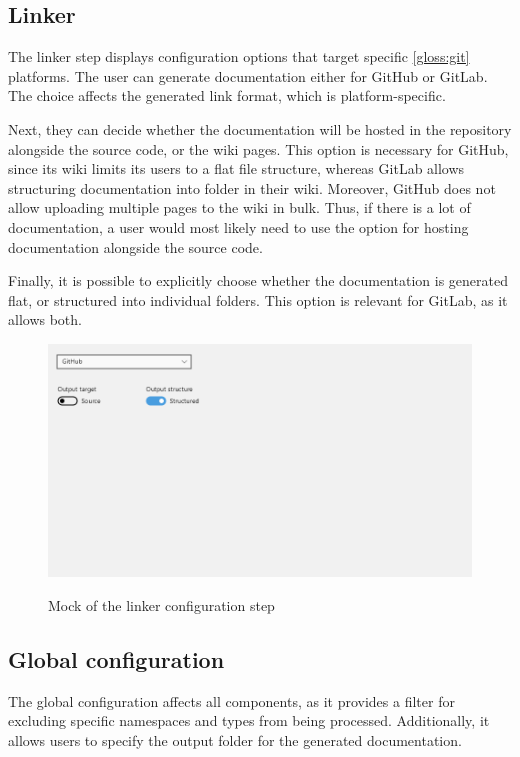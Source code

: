 \pagebreak
\subsection{Linker}

The linker step displays configuration options that target specific \ref{gloss:git} platforms. The user can generate documentation either for GitHub or GitLab. The choice affects the generated link format, which is platform-specific.

Next, they can decide whether the documentation will be hosted in the repository alongside the source code, or the wiki pages. This option is necessary for GitHub, since its wiki limits its users to a flat file structure, whereas GitLab allows structuring documentation into folder in their wiki. Moreover, GitHub does not allow uploading multiple pages to the wiki in bulk. Thus, if there is a lot of documentation, a user would most likely need to use the option for hosting documentation alongside the source code.

Finally, it is possible to explicitly choose whether the documentation is generated flat, or structured into individual folders. This option is relevant for GitLab, as it allows both.

\begin{figure}[H]
    \includegraphics[width=\linewidth]{img/mockLink provider.png}
    \label{fig:pluginLinker}
    \caption{Mock of the linker configuration step}
\end{figure}

\pagebreak
\subsection{Global configuration}

The global configuration affects all components, as it provides a filter for excluding specific namespaces and types from being processed. Additionally, it allows users to specify the output folder for the generated documentation.

